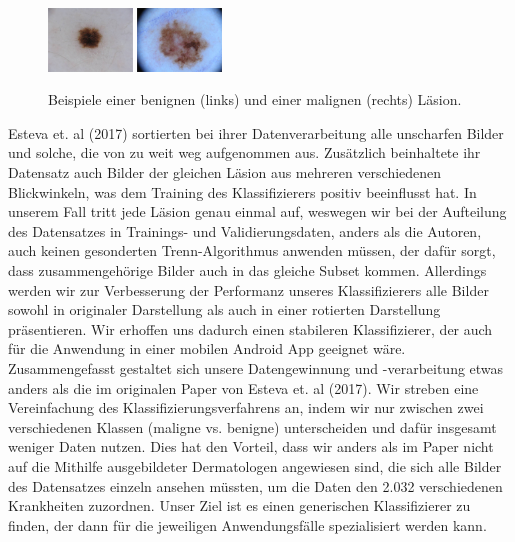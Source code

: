 \documentclass[%
   10pt,              %
   a4paper,           %
   DIV10,             %
]{scrartcl}%
\begin{document}
\begin{figure}[h!]
	\centering
	\includegraphics[width=0.2\textwidth]{fig/example1.jpg}
	\includegraphics[width=0.2\textwidth]{fig/example2.jpg}
	\caption{Beispiele einer benignen (links) und einer malignen (rechts) Läsion.}
	\label{fig_example}
\end{figure}

\noindent Esteva et. al (2017) \cite{skincancer} sortierten bei ihrer Datenverarbeitung alle unscharfen Bilder und solche, die von zu weit weg aufgenommen aus. Zusätzlich beinhaltete ihr Datensatz auch Bilder der gleichen Läsion aus mehreren verschiedenen Blickwinkeln, was dem Training des Klassifizierers positiv beeinflusst hat. In unserem Fall tritt jede Läsion genau einmal auf, weswegen wir bei der Aufteilung des Datensatzes in Trainings- und Validierungsdaten, anders als die Autoren, auch keinen gesonderten Trenn-Algorithmus anwenden müssen, der dafür sorgt, dass zusammengehörige Bilder auch in das gleiche Subset kommen. Allerdings werden wir zur Verbesserung der Performanz unseres Klassifizierers alle Bilder sowohl in originaler Darstellung als auch in einer rotierten Darstellung präsentieren. Wir erhoffen uns dadurch einen stabileren Klassifizierer, der auch für die Anwendung in einer mobilen Android App geeignet wäre.\\
\noindent Zusammengefasst gestaltet sich unsere Datengewinnung und -verarbeitung etwas anders als die im originalen Paper von Esteva et. al (2017). Wir streben eine Vereinfachung des Klassifizierungsverfahrens an, indem wir nur zwischen zwei verschiedenen Klassen (maligne vs. benigne) unterscheiden und dafür insgesamt weniger Daten nutzen. Dies hat den Vorteil, dass wir anders als im Paper nicht auf die Mithilfe ausgebildeter Dermatologen angewiesen sind, die sich alle Bilder des Datensatzes einzeln ansehen müssten, um die Daten den 2.032 verschiedenen Krankheiten zuzordnen. Unser Ziel ist es einen generischen Klassifizierer zu finden, der dann für die jeweiligen Anwendungsfälle spezialisiert werden kann.   
\end{document}
